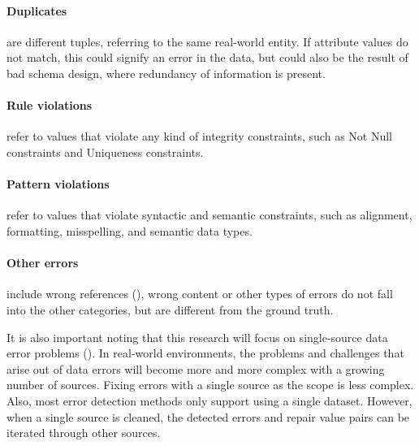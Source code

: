\paragraph{Duplicates} are different tuples, referring to the same real-world entity. If attribute values do not match, this could signify an error in the data, but could also be the result of bad schema design, where redundancy of information is present.

\paragraph{Rule violations} refer to values that violate any kind of integrity constraints, such as Not Null constraints and Uniqueness constraints.

\paragraph{Pattern violations} refer to values that violate syntactic and semantic constraints, such as alignment, formatting, misspelling, and semantic data types.

\paragraph{Other errors} include wrong references (\cite{Rahm2000-fz}), wrong content or other types of errors do not fall into the other categories, but are different from the ground truth.

It is also important noting that this research will focus on single-source data error problems (\cite{Rahm2000-fz}). In real-world environments, the problems and challenges that arise out of data errors will become more and more complex with a growing number of sources. Fixing errors with a single source as the scope is less complex. Also, most error detection methods only support using a single dataset. However, when a single source is cleaned, the detected errors and repair value pairs can be iterated through other sources.

